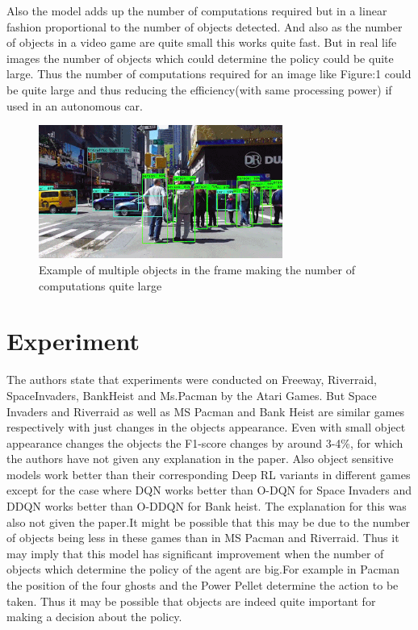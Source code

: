 \documentclass{article}
\begin{document}
Also the model adds up the number of computations required but in a linear fashion proportional to the number of objects detected. And also as the number of objects in a video game are quite small this works quite fast. But in real life images the number of objects which could determine the policy could be quite large. Thus the number of computations required for an image like Figure:1 could be quite large and thus reducing the efficiency(with same processing power) if used in an autonomous car.
\begin{figure}[h]
\includegraphics[width=8cm]{image.png}
\centering
\caption{Example of multiple objects in the frame making the number of computations quite large}
\end{figure}

\section{Experiment }
The authors state that experiments were conducted on Freeway, Riverraid, SpaceInvaders, BankHeist and Ms.Pacman by the Atari Games. But Space Invaders and Riverraid as well as MS Pacman and Bank Heist are similar games respectively with just changes in the objects appearance. Even with small object appearance changes the objects the F1-score changes by around 3-4\%, for which the authors have not given any explanation in the paper. Also object sensitive models work better than their corresponding Deep RL variants in different games except for the case where DQN works better than O-DQN for Space Invaders and DDQN works better than O-DDQN for Bank heist. The explanation for this was also not given the paper.It might be possible that this may be due to the number of objects being less in these games than in MS Pacman and Riverraid. Thus it may imply that this model has significant improvement when the number of objects which determine the policy of the agent are big.For example in Pacman the position of the  four ghosts and the Power Pellet determine the action to be taken. Thus it may be possible that objects are indeed quite important for making a decision about the policy.
\end{document}
